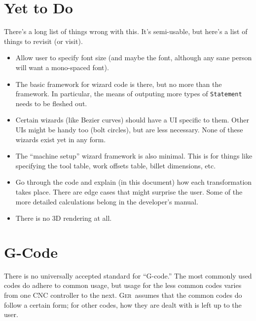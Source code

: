\documentclass[titlepage,oneside,10pt]{article}
\newcommand{\ger}{\textsc{Ger}}
\begin{document}
\raggedbottom

\newcommand{\mymargin}[1]{\marginpar{\rm\tiny #1}}
\newcommand{\leftmar}[1]{\reversemarginpar \mymargin{#1}}

\section{Yet to Do}

There's a long list of things wrong with this. It's semi-usable, but
here's a list of things to revisit (or visit).
\begin{itemize}
\item Allow user to specify font size (and maybe the font, although
  any sane person will want a mono-spaced font).
\item The basic framework for wizard code is there, but no more than
  the framework. In particular, the means of outputing more types of
  {\tt Statement} needs to be fleshed out.
\item Certain wizards (like Bezier curves) should have a UI specific
  to them. Other UIs might be handy too (bolt circles), but are less
  necessary. None of these wizards exist yet in any form.
\item The ``machine setup'' wizard framework is also minimal. This is
  for things like specifying the tool table, work offsets table,
  billet dimensions, etc.
\item Go through the code and explain (in this document) how each
  transformation takes place. There are edge cases that might surprise
  the user. Some of the more detailed calculations belong in the
  developer's manual.
\item There is no 3D rendering at all.
\end{itemize}

\section{G-Code}

There is no universally accepted standard for ``G-code.'' The
most commonly used codes do adhere to common usage, but usage for the
less common codes varies from one CNC controller to the next. \ger\ 
assumes that the common codes do follow a certain form; for 
other codes, how they are dealt with is left up to the user.
\end{document}
